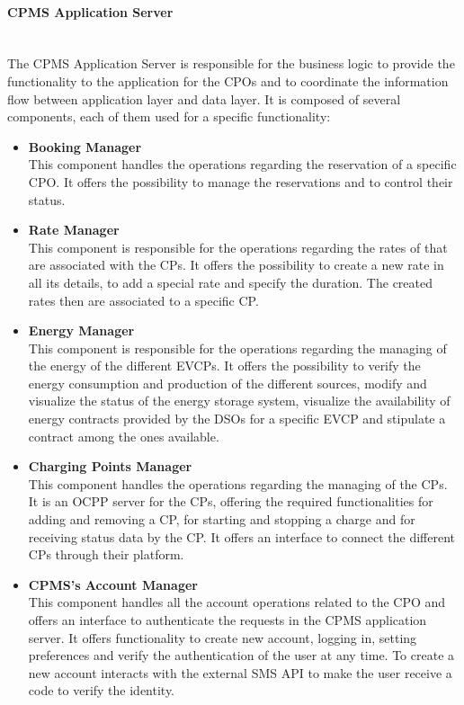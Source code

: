 \paragraph*{CPMS Application Server} \hfill \\
The CPMS Application Server is responsible for the business logic to provide the functionality to the application for the CPOs and to coordinate the information flow between application layer and data layer.
It is composed of several components, each of them used for a specific functionality:\\
\begin{itemize}
    \item \textbf{Booking Manager} \\
    This component handles the operations regarding the reservation of a specific CPO. It offers the possibility to manage the reservations and to control their status.
    \item \textbf{Rate Manager} \\ This component is responsible for the operations regarding the rates of that are associated with the CPs. It offers the possibility to
    create a new rate in all its details, to add a special rate and specify the duration. The created rates then are associated to a specific CP.
    \item \textbf{Energy Manager} \\ This component is responsible for the operations regarding the managing of the energy of the different EVCPs. 
    It offers the possibility to verify the energy consumption and production of the different sources, modify and visualize the status of the energy storage system,
    visualize the availability of energy contracts provided by the DSOs for a specific EVCP and stipulate a contract among the ones available.
    \item \textbf{Charging Points Manager} \\ This component handles the operations regarding the managing of the CPs. It is an OCPP server for the CPs, offering the 
    required functionalities for adding and removing a CP, for starting and stopping a charge and for receiving status data by the CP. It offers an interface to connect the different CPs through their platform.
    \item \textbf{CPMS's Account Manager} \\ This component handles all the account operations related to the CPO and offers an interface to authenticate the requests in the CPMS application server.
          It offers functionality to create new account, logging in, setting preferences and verify the authentication of the user at any time.
          To create a new account interacts with the external SMS API to make the user receive a code to verify the identity.
\end{itemize}

